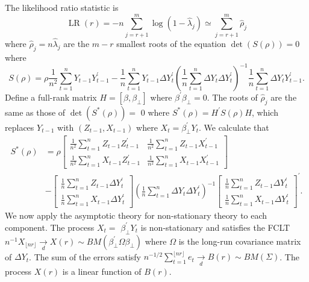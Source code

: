 \documentclass[10pt]{article}
\begin{document}
The likelihood ratio statistic is
$$
\operatorname{LR}(r)=-n \sum_{j=r+1}^{m} \log \left(1-\widehat{\lambda}_{j}\right) \simeq \sum_{j=r+1}^{m} \widehat{\rho}_{j}
$$
where $\widehat{\rho}_{j}=n \widehat{\lambda}_{j}$ are the $m-r$ smallest roots of the equation $\operatorname{det}(S(\rho))=0$ where
$$
S(\rho)=\rho \frac{1}{n^{2}} \sum_{t=1}^{n} Y_{t-1} Y_{t-1}^{\prime}-\frac{1}{n} \sum_{t=1}^{n} Y_{t-1} \Delta Y_{t}^{\prime}\left(\frac{1}{n} \sum_{t=1}^{n} \Delta Y_{t} \Delta Y_{t}^{\prime}\right)^{-1} \frac{1}{n} \sum_{t=1}^{n} \Delta Y_{t} Y_{t-1}^{\prime} .
$$
Define a full-rank matrix $H=\left[\beta, \beta_{\perp}\right]$ where $\beta^{\prime} \beta_{\perp}=0$. The roots of $\widehat{\rho}_{j}$ are the same as those of $\operatorname{det}\left(S^{*}(\rho)\right)=$ 0 where $S^{*}(\rho)=H^{\prime} S(\rho) H$, which replaces $Y_{t-1}$ with $\left(Z_{t-1}, X_{t-1}\right)$ where $X_{t}=\beta_{\perp}^{\prime} Y_{t}$. We calculate that
$$
\begin{aligned}
S^{*}(\rho) &=\rho\left[\begin{array}{cc}
\frac{1}{n^{2}} \sum_{t=1}^{n} Z_{t-1} Z_{t-1}^{\prime} & \frac{1}{n^{2}} \sum_{t=1}^{n} Z_{t-1} X_{t-1}^{\prime} \\
\frac{1}{n^{2}} \sum_{t=1}^{n} X_{t-1} Z_{t-1}^{\prime} & \frac{1}{n^{2}} \sum_{t=1}^{n} X_{t-1} X_{t-1}^{\prime}
\end{array}\right] \\
&-\left[\begin{array}{c}
\frac{1}{n} \sum_{t=1}^{n} Z_{t-1} \Delta Y_{t}^{\prime} \\
\frac{1}{n} \sum_{t=1}^{n} X_{t-1} \Delta Y_{t}^{\prime}
\end{array}\right]\left(\frac{1}{n} \sum_{t=1}^{n} \Delta Y_{t} \Delta Y_{t}^{\prime}\right)^{-1}\left[\begin{array}{c}
\frac{1}{n} \sum_{t=1}^{n} Z_{t-1} \Delta Y_{t}^{\prime} \\
\frac{1}{n} \sum_{t=1}^{n} X_{t-1} \Delta Y_{t}^{\prime}
\end{array}\right]^{\prime} .
\end{aligned}
$$
We now apply the asymptotic theory for non-stationary theory to each component. The process $X_{t}=$ $\beta_{\perp}^{\prime} Y_{t}$ is non-stationary and satisfies the FCLT $n^{-1} X_{\lfloor n r\rfloor} \underset{d}{\longrightarrow} X(r) \sim B M\left(\beta_{\perp}^{\prime} \Omega \beta_{\perp}\right)$ where $\Omega$ is the long-run covariance matrix of $\Delta Y_{t}$. The sum of the errors satisfy $n^{-1 / 2} \sum_{t=1}^{\lfloor n r\rfloor} e_{t} \underset{d}{\longrightarrow} B(r) \sim B M(\Sigma)$. The process $X(r)$ is a linear function of $B(r)$.
\end{document}

